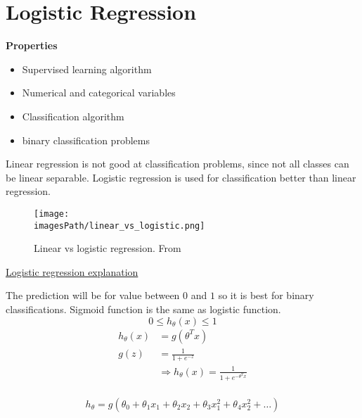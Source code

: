 
\newpage
\section{Logistic Regression}
\textbf{Properties}
\begin{itemize}
    \item Supervised learning algorithm
    \item Numerical and categorical variables 
    \item Classification algorithm
    \item binary classification problems 
\end{itemize}

Linear regression is not good at classification problems, since not all classes can 
be linear separable. Logistic regression is used for classification better than linear regression.
\begin{figure}[!h]
    \centering
    \texttt{[image: \\imagesPath/linear\_vs\_logistic.png]}
    \caption{Linear vs logistic regression. From \cite{}}
\end{figure}
\href{https://www.youtube.com/watch?v=-la3q9d7AKQ}{Logistic regression explanation}

The prediction will be for value between $0$ and $1$ so it is best 
for binary classifications. Sigmoid function is the same as logistic function.
\begin{equation*}
    0 \leq h_{\theta}(x) \leq 1
\end{equation*}
\begin{align*}
    h_{\theta}(x) &= g(\theta^T x) \\
    g(z) &= \frac{1}{1+e^{-z}} \\
    &\Rightarrow h_{\theta}(x) = \frac{1}{1+e^{-\theta^T x}} \\
\end{align*}



\begin{equation*}
    h_{\theta} = g(\theta_0 + \theta_1 x_1 + \theta_2 x_2 + \theta_3 x_1^2 + \theta_4 x_2^2 + \ldots)
\end{equation*}

